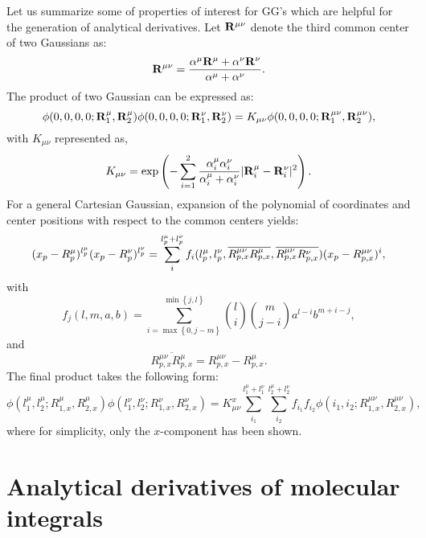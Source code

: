 Let us summarize some of properties of interest for GG's which are helpful
for the generation of analytical derivatives. Let ${\bf R}^{\mu \nu }$
denote the third common center of two Gaussians as: 
\begin{equation}
{\bf R}^{\mu \nu }={\frac{\alpha ^\mu {\bf R}^\mu +\alpha ^\nu {\bf R}^\nu }{%
\alpha ^\mu +\alpha ^\nu }}.
\end{equation}
The product of two Gaussian can be expressed as: 
\begin{equation}
\phi (0,0,0,0;{\bf R}_1^\mu ,{\bf R}_2^\mu )\phi (0,0,0,0;{\bf R}_1^\nu ,%
{\bf R}_2^\nu )=K_{\mu \nu }\phi (0,0,0,0;{\bf R}_1^{\mu \nu },{\bf R}%
_2^{\mu \nu }),
\end{equation}
with $K_{\mu \nu }$ represented as, 
\begin{equation}
K_{\mu \nu }=\exp \left( -\sum_{i=1}^2{\frac{\alpha _i^\mu \alpha _i^\nu }{%
\alpha _i^\mu +\alpha _i^\nu }}|{\bf R}_i^\mu -{\bf R}_i^\nu |^2\right) .
\label{k}
\end{equation}
For a general Cartesian Gaussian, expansion of the polynomial of coordinates
and center positions with respect to the common centers yields: 
\begin{equation}
(x_p-R_p^\mu )^{l_p^\mu }(x_p-R_p^\nu )^{l_p^\nu }=\sum_i^{l_p^\mu +l_p^\nu
}f_i(l_p^\mu ,l_p^\nu ,\overline{R_{p,x}^{\mu \nu }R_{p,x}^\mu },\overline{%
R_{p,x}^{\mu \nu }R_{p,x}^\nu })(x_p-R_{p,x}^{\mu \nu })^i,
\end{equation}
with 
\begin{equation}
f_j(l,m,a,b)=\sum_{i=\max \left\{ 0,j-m\right\} }^{\min \left\{ j,l\right\} }%
{\binom li}{\binom m{j-i}}a^{l-i}b^{m+i-j},
\end{equation}
and 
\begin{equation}
\overline{R_{p,x}^{\mu \nu }R_{p,x}^\mu }=R_{p,x}^{\mu \nu }-R_{p,x}^\mu .
\end{equation}
The final product takes the following form: 
\begin{equation}
\phi (l_1^\mu ,l_2^\mu ;R_{1,x}^\mu ,R_{2,x}^\mu )\phi (l_1^\nu ,l_2^\nu
;R_{1,x}^\nu ,R_{2,x}^\nu )=K_{\mu \nu }^x\sum_{i_1}^{l_1^\mu +l_1^\nu
}\sum_{i_2}^{l_2^\mu +l_2^\nu }f_{i_1}f_{i_2}\phi (i_1,i_2;R_{1,x}^{\mu \nu
},R_{2,x}^{\mu \nu }),
\end{equation}
where for simplicity, only the $x$-component has been shown.

\section{Analytical derivatives of molecular integrals}

